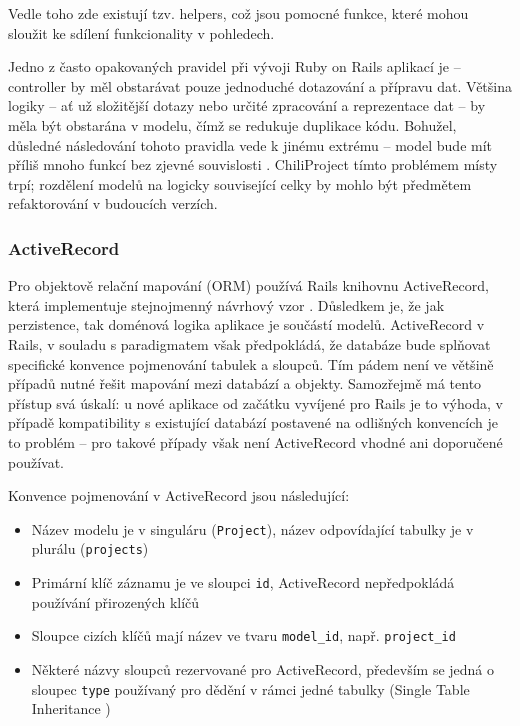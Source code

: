 \documentclass[thesis=B,czech]{FITthesis}[2012/05/02]
\begin{document}
Vedle toho zde existují tzv. helpers, což jsou pomocné funkce, které
mohou sloužit ke sdílení funkcionality v pohledech.

Jedno z často opakovaných pravidel při vývoji Ruby on Rails aplikací je
\citep{Buck2006} -- controller by měl
obstarávat pouze jednoduché dotazování a přípravu dat. Většina logiky --
ať už složitější dotazy nebo určité zpracování a reprezentace dat -- by
měla být obstarána v modelu, čímž se redukuje duplikace kódu. Bohužel,
důsledné následování tohoto pravidla vede k jinému extrému -- model bude mít
příliš mnoho funkcí bez zjevné souvislosti \citep{Libbery2011}.
ChiliProject tímto problémem místy trpí; rozdělení modelů na logicky
související celky \citep{Grimm2012} by mohlo být předmětem refaktorování
v budoucích verzích.

\subsubsection{ActiveRecord}

Pro objektově relační mapování (ORM) používá Rails knihovnu
ActiveRecord, která implementuje stejnojmenný návrhový vzor \citep[str.
160]{Fowler2003}. Důsledkem je, že jak perzistence, tak doménová logika
aplikace je součástí modelů. ActiveRecord v Rails, v souladu
s paradigmatem  však předpokládá, že
databáze bude splňovat specifické konvence pojmenování tabulek a
sloupců. Tím pádem není ve většině případů nutné řešit mapování mezi
databází a objekty. Samozřejmě má tento přístup svá úskalí: u nové
aplikace od začátku vyvíjené pro Rails je to výhoda, v případě
kompatibility s existující databází postavené na odlišných konvencích je
to problém -- pro takové případy však není ActiveRecord vhodné ani
doporučené používat.

Konvence pojmenování v ActiveRecord jsou následující:
\begin{itemize}
\item Název modelu je v singuláru (\lstinline!Project!), název odpovídající tabulky je
v plurálu (\lstinline!projects!)
\item Primární klíč záznamu je ve sloupci \lstinline!id!, ActiveRecord nepředpokládá používání přirozených
klíčů
\item Sloupce cizích klíčů mají název ve tvaru \lstinline!model_id!,
např. \lstinline!project_id!
\item Některé názvy sloupců rezervované pro ActiveRecord, především se jedná o sloupec \lstinline!type!
používaný pro dědění v rámci jedné tabulky (Single Table Inheritance
\citep[str. 278]{Fowler2003})
\end{itemize}
\end{document}
